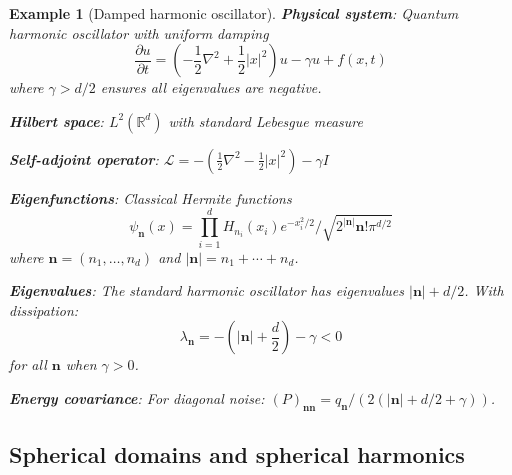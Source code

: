 \documentclass[a4paper,12pt]{article}
\newtheorem{example}[theorem]{Example}
\def\R{\mathbb{R}}
\begin{document}
\begin{example}[Damped harmonic oscillator]\label{ex:hermite}
\textbf{Physical system}: Quantum harmonic oscillator with uniform damping
\begin{equation}
\frac{\partial u}{\partial t} = \left(-\frac{1}{2}\nabla^2 + \frac{1}{2}|x|^2\right) u - \gamma u + f(x,t)
\end{equation}
where $\gamma > d/2$ ensures all eigenvalues are negative.

\textbf{Hilbert space}: $L^2(\R^d)$ with standard Lebesgue measure

\textbf{Self-adjoint operator}: $\mathcal{L} = -\left(\frac{1}{2}\nabla^2 - \frac{1}{2}|x|^2\right) - \gamma I$ 

\textbf{Eigenfunctions}: Classical Hermite functions 
\begin{equation}
\psi_{\mathbf{n}}(x) = \prod_{i=1}^d H_{n_i}(x_i) e^{-x_i^2/2} / \sqrt{2^{|\mathbf{n}|} \mathbf{n}! \pi^{d/2}}
\end{equation}
where $\mathbf{n} = (n_1, \ldots, n_d)$ and $|\mathbf{n}| = n_1 + \cdots + n_d$.

\textbf{Eigenvalues}: The standard harmonic oscillator has eigenvalues $|\mathbf{n}| + d/2$. With dissipation:
\begin{equation}
\lambda_{\mathbf{n}} = -\left(|\mathbf{n}| + \frac{d}{2}\right) - \gamma < 0
\end{equation}
for all $\mathbf{n}$ when $\gamma > 0$.

\textbf{Energy covariance}: For diagonal noise: $(P)_{\mathbf{n}\mathbf{n}} = q_{\mathbf{n}}/(2(|\mathbf{n}| + d/2 + \gamma))$.
\end{example}

\subsection{Spherical domains and spherical harmonics}
\end{document}
